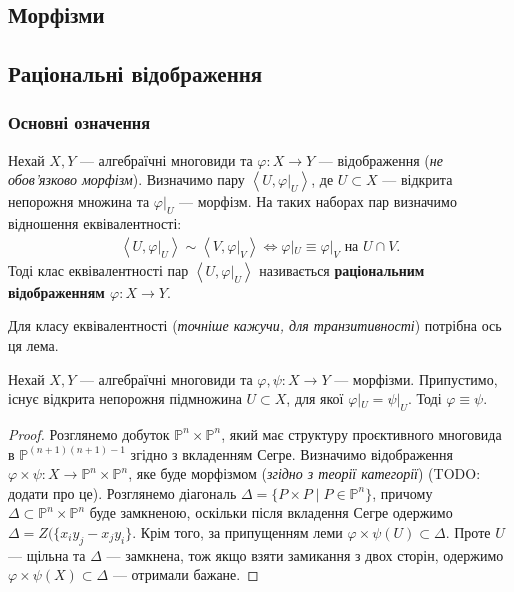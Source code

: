 \documentclass{math_library}
\begin{document}
\subsection{Морфізми}

\subsection{Раціональні відображення}
\subsubsection{Основні означення}
\begin{definition}
Нехай $X,Y$ --- алгебраїчні многовиди та $\varphi \colon X \to Y$ --- відображення (\textit{не обов'язково морфізм}). Визначимо пару $\left<U,\varphi|_U\right>$, де $U \subset X$ --- відкрита непорожня множина та $\varphi|_U$ --- морфізм. На таких наборах пар визначимо відношення еквівалентності:
\begin{align*}
\left<U, \varphi|_U\right> \sim \left<V, \varphi|_V\right> \iff \varphi|_U \equiv \varphi|_V \text{ на } U \cap V.
\end{align*}
Тоді клас еквівалентності пар $\left<U,\varphi|_U\right>$ називається \textbf{раціональним відображенням $\varphi \colon X \to Y$}. 
\end{definition}

Для класу еквівалентності (\textit{точніше кажучи, для транзитивності}) потрібна ось ця лема.

\begin{lemma}
Нехай $X,Y$ --- алгебраїчні многовиди та $\varphi, \psi \colon X \to Y$ --- морфізми. Припустимо, існує відкрита непорожня підмножина $U \subset X$, для якої $\varphi|_U = \psi|_U$. Тоді $\varphi \equiv \psi$.
\end{lemma}

\begin{proof}
Розглянемо добуток $\mathbb{P}^n \times \mathbb{P}^n$, який має структуру проєктивного многовида в $\mathbb{P}^{(n+1)(n+1)-1}$ згідно з вкладенням Сегре. Визначимо відображення $\varphi \times \psi \colon X \to \mathbb{P}^n \times \mathbb{P}^n$, яке буде морфізмом (\textit{згідно з теорії категорії}) (TODO: додати про це). Розглянемо діагональ $\Delta = \{ P \times P \mid P \in \mathbb{P}^n \}$, причому $\Delta \subset \mathbb{P}^n \times \mathbb{P}^n$ буде замкненою, оскільки після вкладення Сегре одержимо $\Delta = Z(\{x_i y_j - x_j y_i\}$. Крім того, за припущенням леми $\varphi \times \psi (U) \subset \Delta$. Проте $U$ --- щільна та $\Delta$ --- замкнена, тож якщо взяти замикання з двох сторін, одержимо $\varphi \times \psi(X) \subset \Delta$ --- отримали бажане.
\end{proof}
\end{document}
